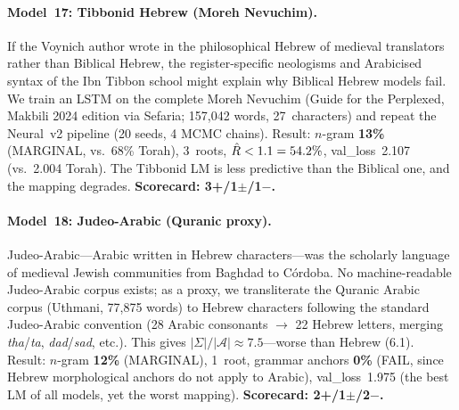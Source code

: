 \paragraph{Model~17: Tibbonid Hebrew (Moreh Nevuchim).}
If the Voynich author wrote in the philosophical Hebrew of medieval translators rather than Biblical Hebrew, the register-specific neologisms and Arabicised syntax of the Ibn Tibbon school might explain why Biblical Hebrew models fail.  We train an LSTM on the complete Moreh Nevuchim (Guide for the Perplexed, Makbili 2024 edition via Sefaria; 157,042 words, 27~characters) and repeat the Neural~v2 pipeline (20 seeds, 4 MCMC chains).  Result: $n$-gram \textbf{13\%} (MARGINAL, vs.\ 68\% Torah), 3~roots, $\hat{R} < 1.1 = 54.2\%$, val\_loss~2.107 (vs.\ 2.004 Torah).  The Tibbonid LM is less predictive than the Biblical one, and the mapping degrades.  \textbf{Scorecard: 3+/1$\pm$/1$-$.}

\paragraph{Model~18: Judeo-Arabic (Quranic proxy).}
Judeo-Arabic---Arabic written in Hebrew characters---was the scholarly language of medieval Jewish communities from Baghdad to Córdoba.  No machine-readable Judeo-Arabic corpus exists; as a proxy, we transliterate the Quranic Arabic corpus (Uthmani, 77,875 words) to Hebrew characters following the standard Judeo-Arabic convention (28 Arabic consonants $\to$ 22 Hebrew letters, merging \emph{tha}/\emph{ta}, \emph{dad}/\emph{sad}, etc.).  This gives $|\Sigma|/|\mathcal{A}| \approx 7.5$---worse than Hebrew (6.1).  Result: $n$-gram \textbf{12\%} (MARGINAL), 1~root, grammar anchors \textbf{0\%} (FAIL, since Hebrew morphological anchors do not apply to Arabic), val\_loss~1.975 (the best LM of all models, yet the worst mapping).  \textbf{Scorecard: 2+/1$\pm$/2$-$.}

